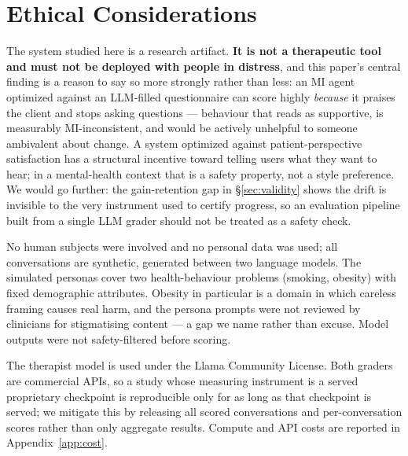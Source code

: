 \section*{Ethical Considerations}

The system studied here is a research artifact. \textbf{It is not a therapeutic tool and
must not be deployed with people in distress}, and this paper's central finding is a reason
to say so more strongly rather than less: an MI agent optimized against an LLM-filled
questionnaire can score highly \emph{because} it praises the client and stops asking
questions --- behaviour that reads as supportive, is measurably MI-inconsistent, and would
be actively unhelpful to someone ambivalent about change. A system optimized against
patient-perspective satisfaction has a structural incentive toward telling users what they
want to hear; in a mental-health context that is a safety property, not a style preference.
We would go further: the gain-retention gap in \S\ref{sec:validity} shows the drift is
invisible to the very instrument used to certify progress, so an evaluation pipeline built
from a single LLM grader should not be treated as a safety check.

No human subjects were involved and no personal data was used; all conversations are
synthetic, generated between two language models. The simulated personas cover two
health-behaviour problems (smoking, obesity) with fixed demographic attributes. Obesity in
particular is a domain in which careless framing causes real harm, and the persona prompts
were not reviewed by clinicians for stigmatising content --- a gap we name rather than
excuse. Model outputs were not safety-filtered before scoring.

The therapist model is used under the Llama Community License. Both graders are commercial
APIs, so a study whose measuring instrument is a served proprietary checkpoint is
reproducible only for as long as that checkpoint is served; we mitigate this by releasing
all scored conversations and per-conversation scores rather than only aggregate results.
 Compute and API costs are reported in Appendix~\ref{app:cost}.

